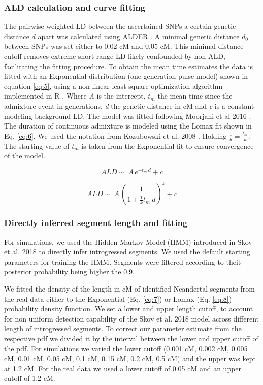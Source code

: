 \documentclass[]{article}
\begin{document}
\subsubsection{ALD calculation and curve fitting}\label{ALD calculation and curve fitting}

The pairwise weighted LD between the ascertained SNPs a certain genetic
distance \(d\) apart was calculated using ALDER
\citep{loh_inferring_2013}. A minimal genetic distance \(d_0\) between
SNPs was set either to 0.02 cM and 0.05 cM. This minimal distance cutoff
removes extreme short range LD likely confounded by non-ALD,
facilitating the fitting procedure. To obtain the mean time estimates
the data is fitted with an Exponential distribution (one generation pulse model) shown in equation
\ref{eq:5}, using a non-linear least-square optimization algorithm
implemented in R \citep{R_Core_Team_2019}. Where \emph{A} is the
intercept, $t_m$ the mean time since the admixture event in generations,
\emph{d} the genetic distance in cM and \emph{c} is a constant modeling
background LD. The model was fitted following Moorjani et al 2016
\citep{moorjani_genetic_2016}. The duration of continuous admixture is
modeled using the Lomax fit shown in Eq. \ref{eq:6}. We used the
notation from Kozubowski et al. 2008 \citep{Kozubowski_Testing_2008}. Holding $\frac{1}{\theta} = \frac{t_m}{k}$.
The starting value of $t_m$  is taken from the Exponential fit to ensure
convergence of the model.


\begin{equation}
\label{eq:5}
ALD \sim\ A\,e^{-t_m \:d}+c
\end{equation}

\begin{equation}
\label{eq:6}
ALD \sim\ A\,\left( \frac{1}{1 + \frac{1}{k}t_m \:d}\right) ^k+c
\end{equation}

\subsubsection{Directly inferred segment length and fitting }\label{Fitting of directly inferred segments length distribution}

For simulations, we used the Hidden Markov Model (HMM) introduced in Skov et al. 2018 to directly infer introgressed segments. We used the default starting parameters for training the HMM. Segments were filtered according to theit posterior probability being higher the 0.9.


We fitted the density of the length in cM of identified Neandertal segments from the real data
either to the Exponential (Eq. \ref{eq:7}) or Lomax (Eq. \ref{eq:8}) probability density function. We set a lower and upper length cutoff, to account for non uniform detection capability of the Skov et al. 2018 model across different length of introgressed segments. To correct our parameter estimate from the respective pdf we divided it by the interval between the lower and upper cutoff of the pdf. For simulations we varied the lower cutoff (0.001 cM, 0.002 cM, 0.005 cM, 0.01 cM, 0.05 cM, 0.1 cM, 0.15 cM, 0.2 cM, 0.5 cM) and the upper was kept at 1.2 cM. For the real data we used a lower cutoff of 0.05 cM and an upper cutoff of 1.2 cM.
\end{document}
